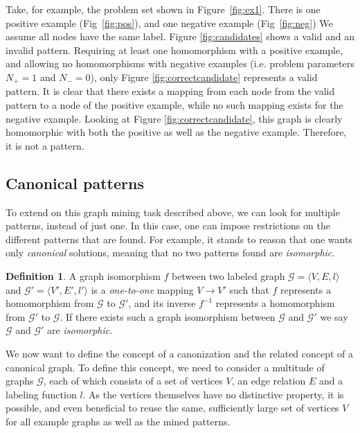 \documentclass{article}
\theoremstyle{definition}
\newtheorem{definition}{Definition}[section]
\newcommand{\triple}[1]{\ensuremath{\langle #1 \rangle}}
\newcommand{\graph}[1]{\ensuremath{\mathcal{#1}}}
\begin{document}
Take, for example, the problem set shown in Figure~\ref{fig:ex1}.
There is one positive example (Fig~\ref{fig:pos}), and one negative example (Fig~\ref{fig:neg})
We assume all nodes have the same label.
Figure \ref{fig:candidates} shows a valid and an invalid pattern.
Requiring at least one homomorphism with a positive example, and allowing no homomorphisms with negative examples (i.e. problem parameters $N_{+}=1$ and $N_{-}=0$), only Figure \ref{fig:correctcandidate} represents a valid pattern.
It is clear that there exists a mapping from each node from the valid pattern to a node of the positive example, while no such mapping exists for the negative example.
Looking at Figure \ref{fig:correctcandidate}, this graph is clearly homomorphic with both the positive as well as the negative example. Therefore, it is not a pattern.

\subsection{Canonical patterns}
To extend on this graph mining task described above, we can look for multiple patterns, instead of just one.
In this case, one can impose restrictions on the different patterns that are found.
For example, it stands to reason that one wants only \emph{canonical} solutions, meaning that no two patterns found are \emph{isomorphic}.

\begin{definition}
\label{def:isomorphism}
A graph isomorphism $f$ between two labeled graph $\graph{G} = \triple{V,E,l}$ and $\graph{G'} = \triple{V',E',l'}$ is a \emph{one-to-one} mapping $V \rightarrow V'$ 
such that $f$ represents a homomorphism from $\graph{G}$ to $\graph{G'}$,
and its inverse $f^{-1}$ represents a homomorphism from $\graph{G'}$ to $\graph{G}$.
If there exists such a graph isomorphism between $\graph{G}$ and $\graph{G'}$ we say $\graph{G}$ and $\graph{G'}$ are \emph{isomorphic}.
\end{definition}

We now want to define the concept of a canonization and the related concept of a canonical graph. 
To define this concept, we need to consider a multitude of graphs $\graph{G}$, each of which consists of a set of vertices $V$, an edge relation $E$ and a labeling function $l$. 
As the vertices themselves have no distinctive property, it is possible, and even beneficial to reuse the same, sufficiently large set of vertices $V$ for all example graphs as well as the mined patterns.
\end{document}
